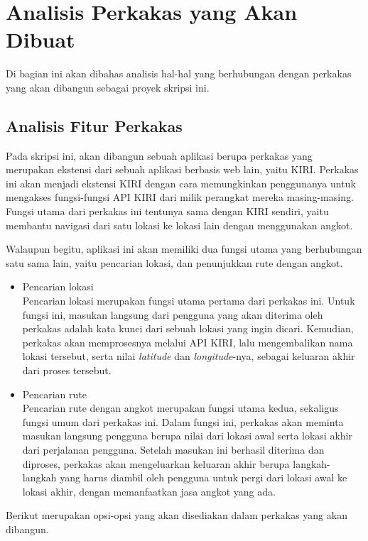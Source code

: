 \section{Analisis Perkakas yang Akan Dibuat}
\label{sec:analysis-thesisapp}

Di bagian ini akan dibahas analisis hal-hal yang berhubungan dengan perkakas yang akan dibangun sebagai proyek skripsi ini.

\subsection{Analisis Fitur Perkakas}
\label{sec:analysis-thesisapp-functions}

Pada skripsi ini, akan dibangun sebuah aplikasi berupa perkakas \cl yang merupakan ekstensi dari sebuah aplikasi berbasis web lain, yaitu KIRI. Perkakas ini akan menjadi ekstensi KIRI dengan cara memungkinkan penggunanya untuk mengakses fungsi-fungsi API KIRI dari \cl milik perangkat mereka masing-masing. Fungsi utama dari perkakas ini tentunya sama dengan KIRI sendiri, yaitu membantu navigasi dari satu lokasi ke lokasi lain dengan menggunakan angkot.

Walaupun begitu, aplikasi ini akan memiliki dua fungsi utama yang berhubungan satu sama lain, yaitu pencarian lokasi, dan penunjukkan rute dengan angkot.

\begin{itemize}
	\item Pencarian lokasi\\
	Pencarian lokasi merupakan fungsi utama pertama dari perkakas ini. Untuk fungsi ini, masukan langsung dari pengguna yang akan diterima oleh perkakas adalah kata kunci dari sebuah lokasi yang ingin dicari. Kemudian, perkakas akan memprosesnya melalui API KIRI, lalu mengembalikan nama lokasi tersebut, serta nilai \textit{latitude} dan \textit{longitude}-nya, sebagai keluaran akhir dari proses tersebut.
	\item Pencarian rute\\
	Pencarian rute dengan angkot merupakan fungsi utama kedua, sekaligus fungsi umum dari perkakas ini. Dalam fungsi ini, perkakas akan meminta masukan langsung pengguna berupa nilai \latlon dari lokasi awal serta lokasi akhir dari perjalanan pengguna. Setelah masukan ini berhasil diterima dan diproses, perkakas akan mengeluarkan keluaran akhir berupa langkah-langkah yang harus diambil oleh pengguna untuk pergi dari lokasi awal ke lokasi akhir, dengan memanfaatkan jasa angkot yang ada.
\end{itemize}
\vspace{\baselineskip}\noindent
Berikut merupakan opsi-opsi yang akan disediakan dalam perkakas yang akan dibangun.

